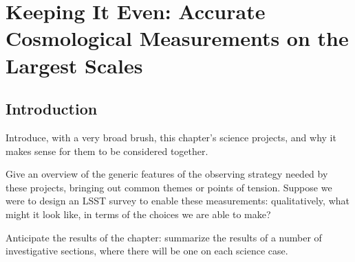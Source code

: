 \chapter[Cosmology]{Keeping It Even: Accurate Cosmological Measurements on the Largest
Scales}
\label{chp:cosmology}



\section{Introduction}
\label{sec:cosmology:intro}

Introduce, with a very broad brush, this chapter's science projects,
and why it makes sense for them to be considered together.





Give an overview of the generic features of the observing strategy
needed by these projects, bringing out common themes or points of
tension. Suppose we were to design an LSST survey to enable these
measurements: qualitatively, what might it look like, in terms of the
choices we are able to make?

Anticipate the results of the chapter: summarize the results of a
number of investigative sections, where there will be one on each
science case.






% 


% 

